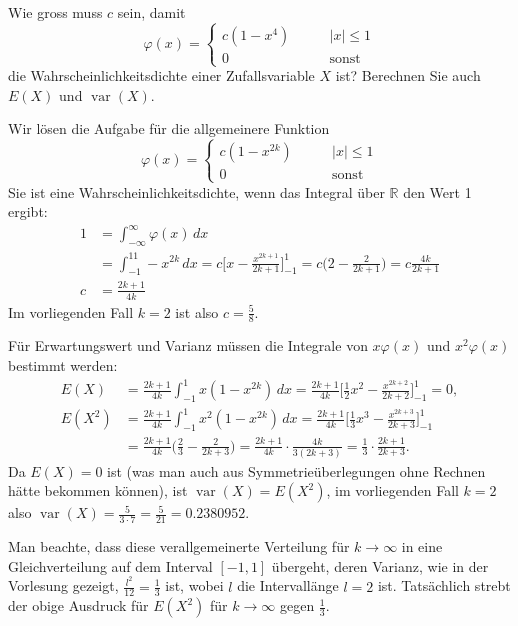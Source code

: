 Wie gross muss $c$ sein, damit
\[
\varphi(x)=\begin{cases}
c(1-x^4)\qquad&|x|\le 1\\
0&\text{sonst}
\end{cases}
\]
die Wahrscheinlichkeitsdichte einer Zufallsvariable $X$ ist? Berechnen 
Sie auch $E(X)$ und $\operatorname{var}(X)$.


\begin{loesung}
Wir lösen die Aufgabe für die allgemeinere Funktion
\[
\varphi(x)=\begin{cases}
c(1-x^{2k})\qquad&|x|\le 1\\
0&\text{sonst}
\end{cases}
\]
Sie ist eine Wahrscheinlichkeitsdichte, wenn das Integral über $\mathbb R$
den Wert 1 ergibt:
\begin{align*}
1&=\int_{-\infty}^{\infty}\varphi(x)\,dx
\\
&=
\int_{-1}^11-x^{2k}\,dx=c\biggl[x-\frac{x^{2k+1}}{2k+1}\biggr]_{-1}^1
=c\biggl(2-\frac{2}{2k+1}\biggr)=c\frac{4k}{2k+1}
\\
c&=\frac{2k+1}{4k}
\end{align*}
Im vorliegenden Fall $k=2$ ist also $c=\frac{5}{8}$.

Für Erwartungswert und Varianz müssen die Integrale von 
$x\varphi(x)$ und $x^2\varphi(x)$ bestimmt werden:
\begin{align*}
E(X)
&=
\frac{2k+1}{4k}
\int_{-1}^1x(1-x^{2k})\,dx
=
\frac{2k+1}{4k}
\biggl[
\frac12x^2-\frac{x^{2k+2}}{2k+2}
\biggr]_{-1}^1=0,
\\
E(X^2)
&=
\frac{2k+1}{4k}\int_{-1}^1x^2(1-x^{2k})\,dx
=
\frac{2k+1}{4k}
\biggl[
\frac13x^3-\frac{x^{2k+3}}{2k+3}
\biggr]_{-1}^1
\\
&=
\frac{2k+1}{4k}
\biggl(
\frac23-\frac{2}{2k+3}
\biggr)
=
\frac{2k+1}{4k}
\cdot
\frac{4k}{3(2k+3)}
=
\frac13\cdot
\frac{2k+1}{2k+3}.
\end{align*}
Da $E(X)=0$ ist (was man auch aus Symmetrieüberlegungen ohne
Rechnen hätte bekommen können), ist $\operatorname{var}(X)=E(X^2)$,
im vorliegenden Fall $k=2$ also 
$\operatorname{var}(X)=\frac{5}{3\cdot 7}=\frac{5}{21}=0.2380952$.

Man beachte, dass diese verallgemeinerte Verteilung für $k\to\infty$
in eine Gleichverteilung auf dem Interval $[-1,1]$ übergeht, deren
Varianz, wie in der Vorlesung gezeigt, $\frac{l^2}{12}=\frac13$ ist, wobei
$l$ die Intervallänge $l=2$ ist. Tatsächlich strebt der obige 
Ausdruck für $E(X^2)$ für $k\to\infty$ gegen $\frac13$.
\end{loesung}
